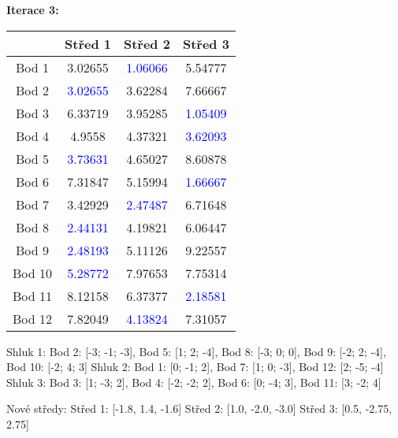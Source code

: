 \documentclass[12pt]{article}
\begin{document}
\newpage
\textbf{Iterace 3:} \newline
\begin{table}[!ht]
    \renewcommand{\arraystretch}{1.3}
    \centering
    \setlength{\tabcolsep}{20pt}
    \begin{tabular}{|c|c|c|c|}
    
    \hline
        & Střed 1 & Střed 2 & Střed 3 \\ \hline
        Bod 1 & 3.02655 & \textcolor{blue}{1.06066} & 5.54777 \\ \hline
        Bod 2 & \textcolor{blue}{3.02655} & 3.62284 & 7.66667  \\ \hline
        Bod 3 & 6.33719 & 3.95285 & \textcolor{blue}{1.05409}  \\ \hline 
        Bod 4 & 4.9558 & 4.37321 & \textcolor{blue}{3.62093}  \\ \hline 
        Bod 5 & \textcolor{blue}{3.73631} & 4.65027 & 8.60878 \\ \hline 
        Bod 6 & 7.31847 &  5.15994 & \textcolor{blue}{1.66667} \\ \hline
        Bod 7 & 3.42929 & \textcolor{blue}{2.47487} & 6.71648  \\ \hline
        Bod 8 & \textcolor{blue}{2.44131} & 4.19821 & 6.06447 \\ \hline 
        Bod 9 & \textcolor{blue}{2.48193} & 5.11126 & 9.22557  \\ \hline
        Bod 10 & \textcolor{blue}{5.28772} & 7.97653 & 7.75314  \\ \hline
        Bod 11 & 8.12158 & 6.37377 & \textcolor{blue}{2.18581}  \\ \hline
        Bod 12 & 7.82049 & \textcolor{blue}{4.13824} & 7.31057 \\
    \hline
    \end{tabular}
    \label{tab:iterace1}
\end{table}
\newline
Shluk 1: Bod 2: [-3; -1; -3], Bod 5: [1; 2; -4], Bod 8: [-3; 0; 0], Bod 9: [-2; 2; -4], \newline 
\null\quad\quad\qquad   Bod 10: [-2; 4; 3] \newline
Shluk 2: Bod 1: [0; -1; 2], Bod 7: [1; 0; -3], Bod 12: [2; -5; -4] \newline
Shluk 3: Bod 3: [1; -3; 2], Bod 4: [-2; -2; 2], Bod 6: [0; -4; 3], Bod 11: [3; -2; 4]

\vspace{0.5cm}

Nové středy: \newline
Střed 1: [-1.8, 1.4, -1.6] \newline
Střed 2: [1.0, -2.0, -3.0] \newline
Střed 3: [0.5, -2.75, 2.75] \newline
\end{document}
